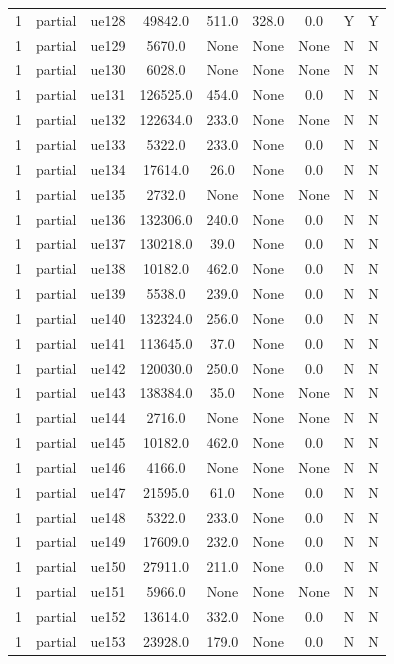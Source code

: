 \begin{table}[ht]
\begin{tabular}{|c|c|c|c|c|c|c|c|c|}
1 & partial & ue128 & 49842.0 & 511.0 & 328.0 & 0.0 & Y & Y \\
1 & partial & ue129 & 5670.0 & None & None & None & N & N \\
1 & partial & ue130 & 6028.0 & None & None & None & N & N \\
1 & partial & ue131 & 126525.0 & 454.0 & None & 0.0 & N & N \\
1 & partial & ue132 & 122634.0 & 233.0 & None & None & N & N \\
1 & partial & ue133 & 5322.0 & 233.0 & None & 0.0 & N & N \\
1 & partial & ue134 & 17614.0 & 26.0 & None & 0.0 & N & N \\
1 & partial & ue135 & 2732.0 & None & None & None & N & N \\
1 & partial & ue136 & 132306.0 & 240.0 & None & 0.0 & N & N \\
1 & partial & ue137 & 130218.0 & 39.0 & None & 0.0 & N & N \\
1 & partial & ue138 & 10182.0 & 462.0 & None & 0.0 & N & N \\
1 & partial & ue139 & 5538.0 & 239.0 & None & 0.0 & N & N \\
1 & partial & ue140 & 132324.0 & 256.0 & None & 0.0 & N & N \\
1 & partial & ue141 & 113645.0 & 37.0 & None & 0.0 & N & N \\
1 & partial & ue142 & 120030.0 & 250.0 & None & 0.0 & N & N \\
1 & partial & ue143 & 138384.0 & 35.0 & None & None & N & N \\
1 & partial & ue144 & 2716.0 & None & None & None & N & N \\
1 & partial & ue145 & 10182.0 & 462.0 & None & 0.0 & N & N \\
1 & partial & ue146 & 4166.0 & None & None & None & N & N \\
1 & partial & ue147 & 21595.0 & 61.0 & None & 0.0 & N & N \\
1 & partial & ue148 & 5322.0 & 233.0 & None & 0.0 & N & N \\
1 & partial & ue149 & 17609.0 & 232.0 & None & 0.0 & N & N \\
1 & partial & ue150 & 27911.0 & 211.0 & None & 0.0 & N & N \\
1 & partial & ue151 & 5966.0 & None & None & None & N & N \\
1 & partial & ue152 & 13614.0 & 332.0 & None & 0.0 & N & N \\
1 & partial & ue153 & 23928.0 & 179.0 & None & 0.0 & N & N \\

\end{tabular}
\end{table}

